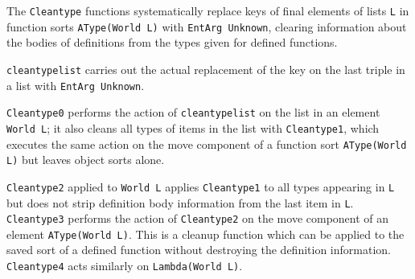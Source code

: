\documentclass{article}
\begin{document}
The {\tt Cleantype} functions systematically replace keys of final elements of lists {\tt L} in function sorts {\tt AType(World L)} with {\tt EntArg Unknown}, clearing information about the bodies of definitions from the types given for defined functions.

{\tt cleantypelist} carries out the actual replacement of the key on the last triple in a list with {\tt EntArg Unknown}.

{\tt Cleantype0} performs the action of {\tt cleantypelist} on the list in an element {\tt World L}; it also cleans all types of items in the list
with {\tt Cleantype1}, which executes the same action on the move component of a function sort {\tt AType(World L)} but leaves object sorts alone.

{\tt Cleantype2} applied to {\tt World L} applies {\tt Cleantype1} to all types appearing in {\tt L} but does not strip definition body information from the last item in {\tt L}.
{\tt Cleantype3} performs the action of {\tt Cleantype2} on the move component of an element {\tt AType(World L)}.  This is a cleanup function which can be applied to the saved sort of a defined function without destroying the definition information. {\tt Cleantype4} acts similarly on {\tt Lambda(World L)}.
\end{document}
